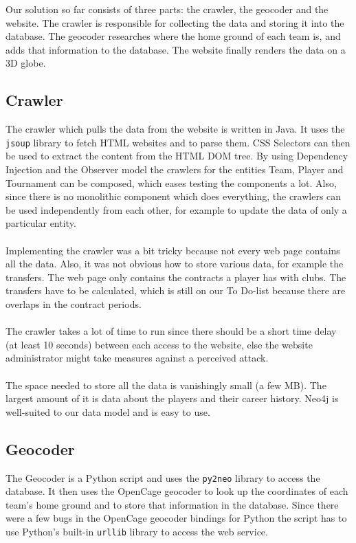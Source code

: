 \documentclass{article}
\begin{document}
Our solution so far consists of three parts: the crawler, the geocoder and the website. The crawler is responsible for collecting the data and storing it into the database. The geocoder researches where the home ground of each team is, and adds that information to the database. The website finally renders the data on a 3D globe.

\subsection{Crawler}

The crawler which pulls the data from the website is written in Java. It uses the \verb+jsoup+ library \cite{jsoup} to fetch HTML websites and to parse them. CSS Selectors can then be used to extract the content from the HTML DOM tree. By using Dependency Injection and the Observer model the crawlers for the entities Team, Player and Tournament can be composed, which eases testing the components a lot. Also, since there is no monolithic component which does everything, the crawlers can be used independently from each other, for example to update the data of only a particular entity. 
\\ \\
Implementing the crawler was a bit tricky because not every web page contains all the data. Also, it was not obvious how to store various data, for example the transfers. The web page only contains the contracts a player has with clubs. The transfers have to be calculated, which is  still on our To Do-list because there are overlaps in the contract periods. 
\\ \\
The crawler takes a lot of time to run since there should be a short time delay (at least 10 seconds) between each access to the website, else the website administrator might take measures against a perceived attack.
\\ \\
The space needed to store all the data is vanishingly small (a few MB). The largest amount of it is data about the players and their career history. Neo4j is well-suited to our data model and is easy to use. 

\subsection{Geocoder}

The Geocoder is a Python script and uses the \verb+py2neo+ library to access the database. It then uses the OpenCage geocoder \cite{OpenCage} to look up the coordinates of each team's home ground and to store that information in the database. Since there were a few bugs in the OpenCage geocoder bindings for Python the script has to use Python's built-in \verb+urllib+ library to access the web service.
\end{document}
